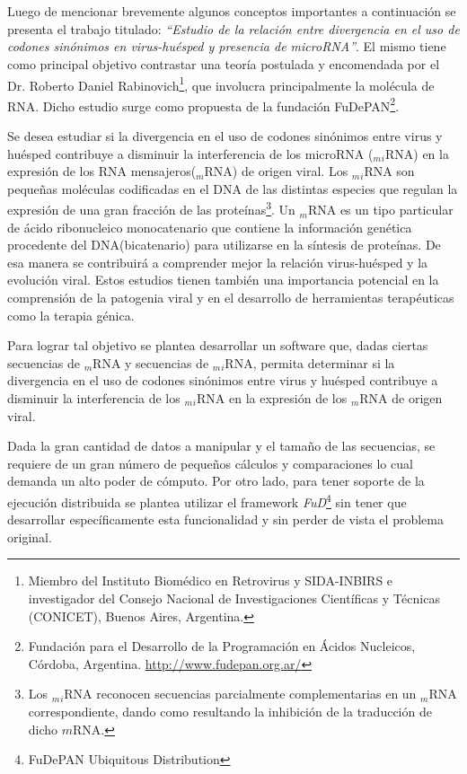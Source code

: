 \section*{\remo}
\par Luego de mencionar brevemente algunos conceptos importantes a continuación se presenta el trabajo titulado: \emph{``Estudio de la relación entre divergencia en el uso de codones sinónimos en virus-huésped y presencia de microRNA''}. El mismo tiene como principal objetivo contrastar una teoría postulada y encomendada por el Dr. Roberto Daniel Rabinovich\footnote{Miembro del Instituto Biomédico en Retrovirus y SIDA-INBIRS e investigador del Consejo Nacional de Investigaciones Científicas y Técnicas (CONICET), Buenos Aires, Argentina.}, que involucra principalmente la molécula de RNA. Dicho estudio surge como propuesta de la fundación FuDePAN\footnote{Fundación para el Desarrollo de la Programación en Ácidos Nucleicos, Córdoba, Argentina. \url{http://www.fudepan.org.ar/}}.

\par Se desea estudiar si la divergencia en el uso de codones sinónimos entre virus y huésped contribuye a disminuir la interferencia de los microRNA ($_m$$_i$RNA) en la expresión de los RNA mensajeros($_m$RNA) de origen viral. Los $_m$$_i$RNA son pequeñas moléculas codificadas en el DNA de las distintas especies que regulan la expresión de una gran fracción de las proteínas\footnote{Los $_m$$_i$RNA reconocen secuencias parcialmente complementarias en un $_m$RNA correspondiente, dando como resultando la inhibición de la traducción de dicho $m$RNA.}. Un $_m$RNA es un tipo particular de ácido ribonucleico monocatenario que contiene la información genética procedente del DNA(bicatenario) para utilizarse en la síntesis de proteínas. De esa manera se contribuirá a comprender mejor la relación virus-huésped y la evolución viral. Estos estudios tienen también una importancia potencial en la comprensión de la patogenia viral y en el desarrollo de herramientas terapéuticas como la terapia génica.

\par Para lograr tal objetivo se plantea desarrollar un software que, dadas ciertas secuencias de $_m$RNA y secuencias de $_m$$_i$RNA, permita determinar si la divergencia en el uso de codones sinónimos entre virus y huésped contribuye a disminuir la interferencia de los $_m$$_i$RNA en la expresión de los $_m$RNA de origen viral.

\par Dada la gran cantidad de datos a manipular y el tamaño de las secuencias, se requiere de un gran número de pequeños cálculos y comparaciones lo cual demanda un alto poder de cómputo. Por otro lado, para tener soporte de la ejecución distribuida se plantea utilizar el framework \emph{FuD}\footnote{FuDePAN Ubiquitous Distribution}\cite{clus09} sin tener que desarrollar específicamente esta funcionalidad y sin perder de vista el problema original.

